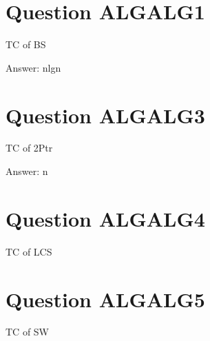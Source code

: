 

\section{Question ALGALG1}

TC of BS

Answer: nlgn


\section{Question ALGALG3}

TC of 2Ptr

Answer: n


\section{Question ALGALG4}

TC of LCS



\section{Question ALGALG5}

TC of SW

